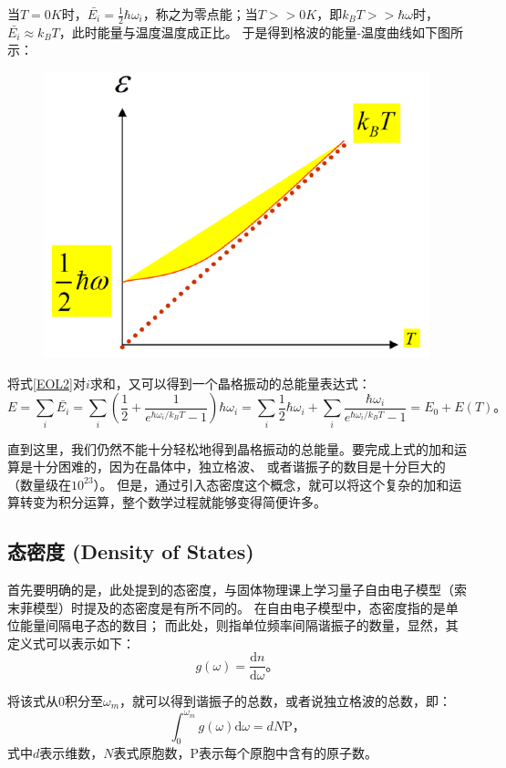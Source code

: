 \documentclass[declarePage]{ecnuthesis}
\begin{document}
当$T=0K$时，$\bar{E_i}=\frac{1}{2}\hbar \omega_i$，称之为零点能；当$T>>0K$，即$k_BT>>\hbar \omega$时，$\bar{E_i} \approx k_BT$，此时能量与温度温度成正比。%
于是得到格波的能量-温度曲线如下图所示：
\begin{figure}[htb]
    \centering
    \includegraphics[width=.5\textwidth]{ET.png}
\end{figure}

将式\ref{EOL2}对$i$求和，又可以得到一个晶格振动的总能量表达式：
\begin{equation}
    E = \sum_i \bar{E_i} = \sum_i \left(\frac{1}{2} + \frac{1}{e^{\hbar \omega_i / k_B T}-1}\right)\hbar \omega_i = \sum_i \frac{1}{2}\hbar \omega_i + \sum_i \frac{\hbar \omega_i}{e^{\hbar \omega_i / k_B T}-1} = E_0 + E(T) \text{。} \label{EOC2}
\end{equation}

直到这里，我们仍然不能十分轻松地得到晶格振动的总能量。要完成上式的加和运算是十分困难的，因为在晶体中，独立格波、%
或者谐振子的数目是十分巨大的（数量级在$10^{23}$）。%
但是，通过引入态密度这个概念，就可以将这个复杂的加和运算转变为积分运算，整个数学过程就能够变得简便许多。

\subsection{态密度 (Density of States)}

首先要明确的是，此处提到的态密度，与固体物理课上学习量子自由电子模型（索末菲模型）时提及的态密度是有所不同的。%
在自由电子模型中，态密度指的是单位能量间隔电子态的数目；%
而此处，则指单位频率间隔谐振子的数量，显然，其定义式可以表示如下：
\begin{equation}
    g(\omega) = \frac{\mathrm{d}n}{\mathrm{d}\omega} \text{。}
\end{equation}

将该式从0积分至$\omega_m$，就可以得到谐振子的总数，或者说独立格波的总数，即：
\begin{equation}
    \int_{0}^{\omega_m} g(\omega) \mathrm{d}\omega = dN \mathrm{P} \text{，}
\end{equation}
式中$d$表示维数，$N$表式原胞数，P表示每个原胞中含有的原子数。
\end{document}
